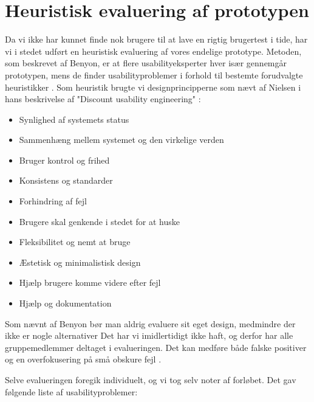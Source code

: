 \section{Heuristisk evaluering af prototypen}
Da vi ikke har kunnet finde nok brugere til at lave en rigtig brugertest i tide, har vi i stedet udført en
heuristisk evaluering af vores endelige prototype. Metoden, som beskrevet af Benyon, er at flere usabilityeksperter
hver især gennemgår prototypen, mens de finder usabilityproblemer i forhold til bestemte forudvalgte heuristikker
\cite[s. 228]{Benyon2010}. Som heuristik brugte vi designprincipperne som nævt af Nielsen i hans beskrivelse af "Discount usability engineering" \cite[tabel 2.2]{nielsen}:

\begin{itemize}
\item Synlighed af systemets status
\item Sammenhæng mellem systemet og den virkelige verden
\item Bruger kontrol og frihed
\item Konsistens og standarder
\item Forhindring af fejl
\item Brugere skal genkende i stedet for at huske
\item Fleksibilitet og nemt at bruge
\item Æstetisk og minimalistisk design
\item Hjælp brugere komme videre efter fejl
\item Hjælp og dokumentation
\end{itemize}

Som nævnt af Benyon bør man aldrig evaluere sit eget design, medmindre der ikke er nogle alternativer
Det har vi imidlertidigt ikke haft, og derfor har alle gruppemedlemmer deltaget i evalueringen. Det kan  
medføre både falske positiver og en overfokusering på små obskure fejl \cite[s. 229]{Benyon2010}. 

Selve evalueringen foregik individuelt, og vi tog selv noter af forløbet. Det gav følgende liste af usabilityproblemer:


